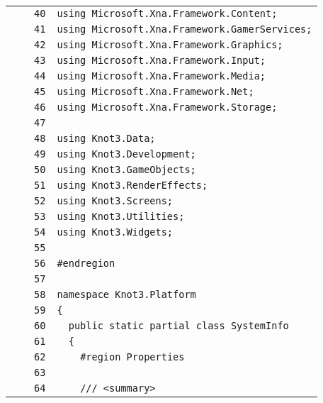 \documentclass[a4paper,10pt]{article}
\begin{document}
\begin{longtable}[l]{lrrl}
\cellcolor{gray} &  & \verb~40~ & \verb~using Microsoft.Xna.Framework.Content;~\\
\cellcolor{gray} &  & \verb~41~ & \verb~using Microsoft.Xna.Framework.GamerServices;~\\
\cellcolor{gray} &  & \verb~42~ & \verb~using Microsoft.Xna.Framework.Graphics;~\\
\cellcolor{gray} &  & \verb~43~ & \verb~using Microsoft.Xna.Framework.Input;~\\
\cellcolor{gray} &  & \verb~44~ & \verb~using Microsoft.Xna.Framework.Media;~\\
\cellcolor{gray} &  & \verb~45~ & \verb~using Microsoft.Xna.Framework.Net;~\\
\cellcolor{gray} &  & \verb~46~ & \verb~using Microsoft.Xna.Framework.Storage;~\\
\cellcolor{gray} &  & \verb~47~ & \verb~~\\
\cellcolor{gray} &  & \verb~48~ & \verb~using Knot3.Data;~\\
\cellcolor{gray} &  & \verb~49~ & \verb~using Knot3.Development;~\\
\cellcolor{gray} &  & \verb~50~ & \verb~using Knot3.GameObjects;~\\
\cellcolor{gray} &  & \verb~51~ & \verb~using Knot3.RenderEffects;~\\
\cellcolor{gray} &  & \verb~52~ & \verb~using Knot3.Screens;~\\
\cellcolor{gray} &  & \verb~53~ & \verb~using Knot3.Utilities;~\\
\cellcolor{gray} &  & \verb~54~ & \verb~using Knot3.Widgets;~\\
\cellcolor{gray} &  & \verb~55~ & \verb~~\\
\cellcolor{gray} &  & \verb~56~ & \verb~#endregion~\\
\cellcolor{gray} &  & \verb~57~ & \verb~~\\
\cellcolor{gray} &  & \verb~58~ & \verb~namespace Knot3.Platform~\\
\cellcolor{gray} &  & \verb~59~ & \verb~{~\\
\cellcolor{gray} &  & \verb~60~ & \verb~  public static partial class SystemInfo~\\
\cellcolor{gray} &  & \verb~61~ & \verb~  {~\\
\cellcolor{gray} &  & \verb~62~ & \verb~    #region Properties~\\
\cellcolor{gray} &  & \verb~63~ & \verb~~\\
\cellcolor{gray} &  & \verb~64~ & \verb~    /// <summary>~\\

\end{longtable}
\end{document}
